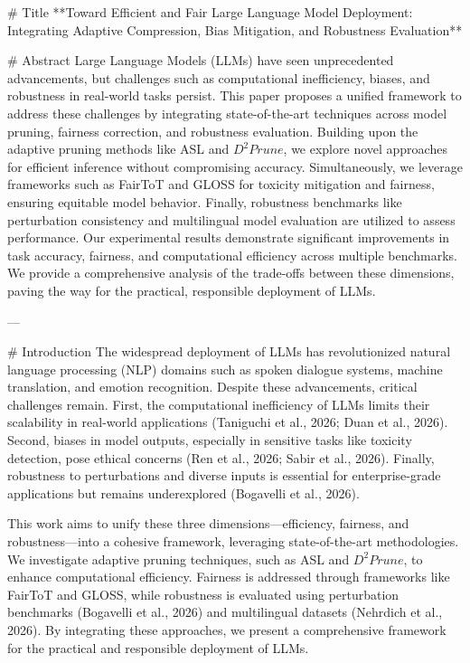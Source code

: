 # Title  
**Toward Efficient and Fair Large Language Model Deployment: Integrating Adaptive Compression, Bias Mitigation, and Robustness Evaluation**

# Abstract  
Large Language Models (LLMs) have seen unprecedented advancements, but challenges such as computational inefficiency, biases, and robustness in real-world tasks persist. This paper proposes a unified framework to address these challenges by integrating state-of-the-art techniques across model pruning, fairness correction, and robustness evaluation. Building upon the adaptive pruning methods like ASL and $D^2Prune$, we explore novel approaches for efficient inference without compromising accuracy. Simultaneously, we leverage frameworks such as FairToT and GLOSS for toxicity mitigation and fairness, ensuring equitable model behavior. Finally, robustness benchmarks like perturbation consistency and multilingual model evaluation are utilized to assess performance. Our experimental results demonstrate significant improvements in task accuracy, fairness, and computational efficiency across multiple benchmarks. We provide a comprehensive analysis of the trade-offs between these dimensions, paving the way for the practical, responsible deployment of LLMs.

---

# Introduction  
The widespread deployment of LLMs has revolutionized natural language processing (NLP) domains such as spoken dialogue systems, machine translation, and emotion recognition. Despite these advancements, critical challenges remain. First, the computational inefficiency of LLMs limits their scalability in real-world applications (Taniguchi et al., 2026; Duan et al., 2026). Second, biases in model outputs, especially in sensitive tasks like toxicity detection, pose ethical concerns (Ren et al., 2026; Sabir et al., 2026). Finally, robustness to perturbations and diverse inputs is essential for enterprise-grade applications but remains underexplored (Bogavelli et al., 2026).  

This work aims to unify these three dimensions—efficiency, fairness, and robustness—into a cohesive framework, leveraging state-of-the-art methodologies. We investigate adaptive pruning techniques, such as ASL and $D^2Prune$, to enhance computational efficiency. Fairness is addressed through frameworks like FairToT and GLOSS, while robustness is evaluated using perturbation benchmarks (Bogavelli et al., 2026) and multilingual datasets (Nehrdich et al., 2026). By integrating these approaches, we present a comprehensive framework for the practical and responsible deployment of LLMs.

